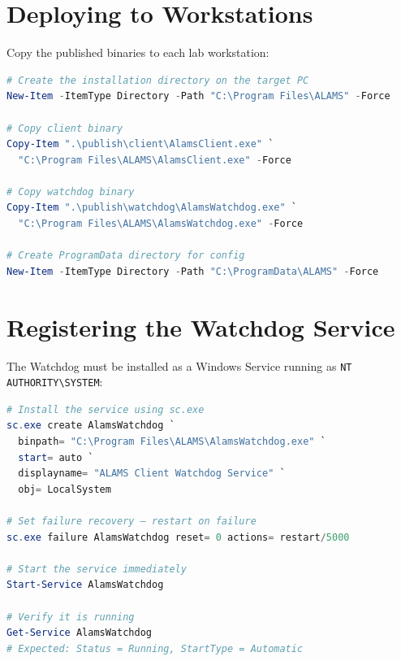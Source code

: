 \section{Deploying to Workstations}

Copy the published binaries to each lab workstation:

\begin{tcolorbox}[codebox, title={Copy Binaries to Workstation (PowerShell or Robocopy)}]
\begin{lstlisting}[language=PowerShell]
# Create the installation directory on the target PC
New-Item -ItemType Directory -Path "C:\Program Files\ALAMS" -Force

# Copy client binary
Copy-Item ".\publish\client\AlamsClient.exe" `
  "C:\Program Files\ALAMS\AlamsClient.exe" -Force

# Copy watchdog binary
Copy-Item ".\publish\watchdog\AlamsWatchdog.exe" `
  "C:\Program Files\ALAMS\AlamsWatchdog.exe" -Force

# Create ProgramData directory for config
New-Item -ItemType Directory -Path "C:\ProgramData\ALAMS" -Force
\end{lstlisting}
\end{tcolorbox}

\section{Registering the Watchdog Service}

The Watchdog must be installed as a Windows Service running as \texttt{NT AUTHORITY\textbackslash SYSTEM}:

\begin{tcolorbox}[codebox, title={Install Watchdog Windows Service (Run as Administrator)}]
\begin{lstlisting}[language=PowerShell]
# Install the service using sc.exe
sc.exe create AlamsWatchdog `
  binpath= "C:\Program Files\ALAMS\AlamsWatchdog.exe" `
  start= auto `
  displayname= "ALAMS Client Watchdog Service" `
  obj= LocalSystem

# Set failure recovery — restart on failure
sc.exe failure AlamsWatchdog reset= 0 actions= restart/5000

# Start the service immediately
Start-Service AlamsWatchdog

# Verify it is running
Get-Service AlamsWatchdog
# Expected: Status = Running, StartType = Automatic
\end{lstlisting}
\end{tcolorbox}

